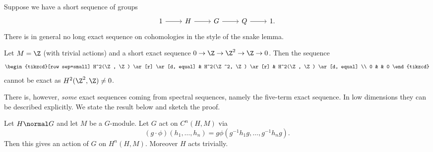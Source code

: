 \documentclass[a4paper]{article}
\begin{document}
Suppose we have a short sequence of groups
\[
  \begin{tikzcd}
    1 \ar[r] & H \ar[r] & G \ar[r] & Q \ar[r] & 1.
  \end{tikzcd}
\]
There is in general no long exact sequence on cohomologies in the style of the snake lemma.

\begin{eg}
  Let \(M = \Z\) (with trivial actions) and a short exact sequence \(0 \to \Z \to \Z^2 \to \Z \to 0\). Then the sequence
  \[
    \begin{tikzcd}[row sep=small]
      H^2(\Z, \Z) \ar[r] \ar[d, equal] & H^2(\Z^2, \Z) \ar[r] & H^2(\Z, \Z) \ar[d, equal] \\
      0 & & 0
    \end{tikzcd}
  \]
  cannot be exact as \(H^2(\Z^2, \Z) \ne 0\).
\end{eg}

There is, however, \emph{some} exact sequences coming from spectral sequences, namely the five-term exact sequence. In low dimensions they can be described explicitly. We state the result below and sketch the proof.

\begin{lemma}
  Let \(H \normal G\) and let \(M\) be a \(G\)-module. Let \(G\) act on \(C^n(H, M)\) via
  \[
    (g \cdot \phi)(h_1, \dots, h_n) = g \phi(g^{-1} h_1g, \dots, g^{-1}h_n g).
  \]
  Then this gives an action of \(G\) on \(H^n(H, M)\). Moreover \(H\) acts trivially.
\end{lemma}
\end{document}
